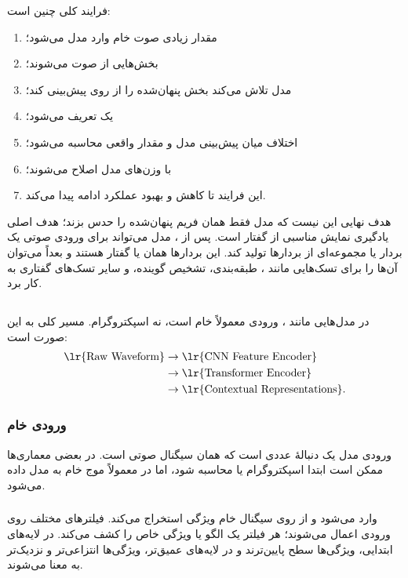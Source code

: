 فرایند کلی چنین است:
\begin{enumerate}
    \item مقدار زیادی صوت خام وارد مدل می‌شود؛
    \item بخش‌هایی از صوت  می‌شوند؛
    \item مدل تلاش می‌کند بخش پنهان‌شده را از روی  پیش‌بینی کند؛
    \item یک  تعریف می‌شود؛
    \item اختلاف میان پیش‌بینی مدل و مقدار واقعی محاسبه می‌شود؛
    \item با  وزن‌های مدل اصلاح می‌شوند؛
    \item این فرایند تا کاهش  و بهبود عملکرد ادامه پیدا می‌کند.
\end{enumerate}

هدف نهایی این نیست که مدل فقط همان فریم پنهان‌شده را حدس بزند؛ هدف اصلی یادگیری نمایش مناسبی از گفتار است. پس از ، مدل می‌تواند برای ورودی صوتی یک بردار یا مجموعه‌ای از بردارها تولید کند. این بردارها همان  یا  گفتار هستند و بعداً می‌توان آن‌ها را برای تسک‌هایی مانند ، طبقه‌بندی، تشخیص گوینده،  و سایر تسک‌های گفتاری به کار برد.

\subsection{}
در مدل‌هایی مانند ، ورودی معمولاً  خام است، نه اسپکتروگرام. مسیر کلی به این صورت است:
\[
\begin{aligned}
\text{\lr{Raw Waveform}} &\rightarrow \text{\lr{CNN Feature Encoder}}\\
&\rightarrow \text{\lr{Transformer Encoder}}\\
&\rightarrow \text{\lr{Contextual Representations}}.
\end{aligned}
\]

\subsubsection{ورودی خام}
ورودی مدل یک دنبالهٔ عددی است که همان  سیگنال صوتی است. در بعضی معماری‌ها ممکن است ابتدا اسپکتروگرام یا  محاسبه شود، اما در  معمولاً موج خام به مدل داده می‌شود.

\subsubsection{}
 وارد  می‌شود و  از روی سیگنال خام ویژگی استخراج می‌کند. فیلترهای مختلف روی ورودی اعمال می‌شوند؛ هر فیلتر یک الگو یا ویژگی خاص را کشف می‌کند. در لایه‌های ابتدایی، ویژگی‌ها سطح پایین‌ترند و در لایه‌های عمیق‌تر، ویژگی‌ها انتزاعی‌تر و نزدیک‌تر به معنا می‌شوند.


